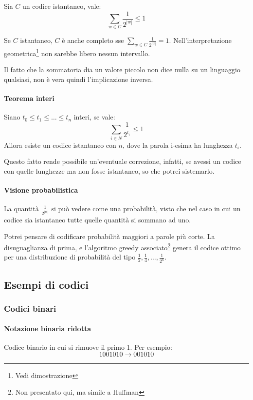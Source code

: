 \begin{definition}
    Sia $C$ un codice istantaneo, vale: 
    $$\sum_{w \in C} \frac{1}{2^{|w|}} \leq 1$$
\end{definition}
Se $C$ istantaneo, $C$ è anche completo sse $\sum_{w \in C} \frac{1}{2^{|w|}} = 1$.
Nell'interpretazione geometrica\footnote{Vedi dimostrazione} non sarebbe
libero nessun intervallo. 

\begin{remark}
    Il fatto che la sommatoria dia un valore piccolo non dice nulla su un linguaggio 
    qualsiasi, non è vera quindi l'implicazione inversa.
\end{remark}

\paragraph{Teorema interi}
Siano $t_0 \leq t_1 \leq \dots \leq t_n$ interi, se vale:
$$\sum_{i \in N} \frac{1}{2^{t_i}} \leq 1$$
Allora esiste un codice istantaneo con $n$, dove la parola i-esima ha lunghezza $t_i$.

Questo fatto rende possibile un'eventuale correzione, infatti, se avessi un codice con quelle lunghezze 
ma non fosse istantaneo, so che potrei sistemarlo.

\paragraph{Visione probabilistica}
La quantità $\frac{1}{2^{|w|}}$ si può vedere come una probabilità, visto che nel caso 
in cui un codice sia istantaneo tutte quelle quantità si sommano ad uno.

Potrei pensare di codificare probabilità maggiori a parole più corte. 
La disuguaglianza di prima, e l'algoritmo greedy associato\footnote{Non presentato qui, ma simile a Huffman}
genera il codice ottimo per una distribuzione di probabilità del tipo $\frac{1}{2}, \frac{1}{4}, \dots, \frac{1}{2^k}$.

\subsection{Esempi di codici}

\subsubsection{Codici binari}

\paragraph{Notazione binaria ridotta}
Codice binario in cui si rimuove il primo 1. Per esempio: $$1001010 \rightarrow 001010$$

